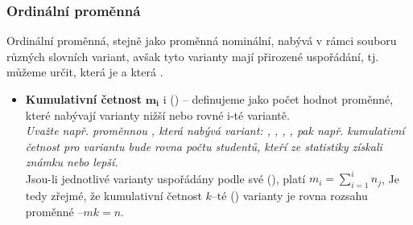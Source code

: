 \subsubsection{Ordinální proměnná}
Ordinální proměnná, stejně jako proměnná nominální, nabývá v rámci souboru různých slovních variant, avšak tyto varianty mají přirozené uspořádání, tj. můžeme určit, která je  a která . 
\begin{itemize}
	\item \textbf{Kumulativní četnost} $\mathbf{m_i}$ i () -- definujeme jako počet hodnot proměnné, které nabývají varianty nižší nebo rovné i-té variantě. \\ 
	\textit{Uvažte např. proměnnou , která nabývá variant: , , , , pak např. kumulativní četnost pro variantu  bude rovna počtu studentů, kteří ze statistiky získali známku  nebo lepší.} \\
	Jsou-li jednotlivé varianty uspořádány podle své (), platí $m_i = \sum\limits_{i=1}^i n_j$, Je tedy zřejmé, že kumulativní četnost $k$--té () varianty je rovna rozsahu proměnné $– mk = n$.


\end{itemize}
